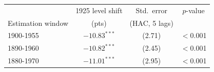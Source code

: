 \begin{tabular}{lccc}
\toprule
 & 1925 level shift & Std.\ error & $p$-value \\
Estimation window & (pts) & (HAC, 5 lags) & \\
\midrule
1900-1955 & $-10.83^{***}$ & (2.71) & $<$0.001 \\
1890-1960 & $-10.82^{***}$ & (2.45) & $<$0.001 \\
1880-1970 & $-11.01^{***}$ & (2.95) & $<$0.001 \\
\bottomrule
\end{tabular}
